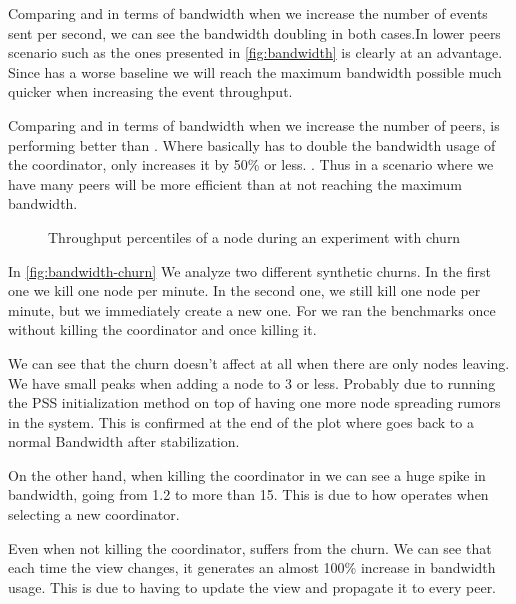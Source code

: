 Comparing \epto and \jgroups in terms of bandwidth when we increase the number of events sent per second, we can see the bandwidth doubling in both cases.In lower peers scenario such as the ones presented in \autoref{fig:bandwidth} \jgroups is clearly at an advantage. Since \epto has a worse baseline we will reach the maximum bandwidth possible much quicker when increasing the event throughput.

Comparing \epto and \jgroups in terms of bandwidth when we increase the number of peers, \epto is performing better than \jgroups. Where \jgroups basically has to double the bandwidth usage of the coordinator, \epto only increases it by 50\% or less. . Thus in a scenario where we have many peers \epto will be more efficient than \jgroups at not reaching the maximum bandwidth.

\begin{figure}[htp]
	\centering
	
	\vspace{-2mm} 
	\caption{Throughput percentiles of a node during an experiment with churn}
	\vspace{-2mm} 
	\label{fig:bandwidth-churn}
\end{figure}

In \autoref{fig:bandwidth-churn} We analyze two different synthetic churns. In the first one we kill one node per minute. In the second one, we still kill one node per minute, but we immediately create a new one. For \jgroups we ran the benchmarks once without killing the coordinator and once killing it.

We can see that the churn doesn't affect  \epto at all when there are only nodes leaving. We have small peaks when adding a node to \SI{3}{\mbps} or less. Probably due to running the PSS initialization method on top of having one more node spreading rumors in the system. This is confirmed at the end of the plot where \epto goes back to a normal Bandwidth after stabilization.

On the other hand, when killing the coordinator in \jgroups we can see a huge spike in bandwidth, going from \SI{1.2}{\mbps} to more than \SI{15}{\mbps}. This is due to how \jgroups operates when selecting a new coordinator.

Even when not killing the coordinator, \jgroups suffers from the churn. We can see that each time the view changes, it generates an almost 100\% increase in bandwidth usage. This is due to \jgroups having to update the view and propagate it to every peer.

